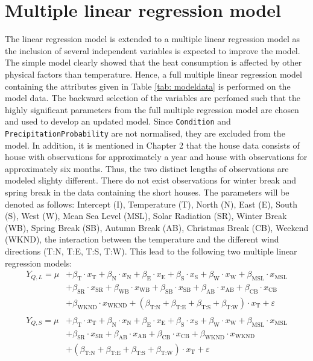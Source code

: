 \section{Multiple linear regression model}
The linear regression model is extended to a multiple linear regression model as the inclusion of several independent variables is expected to improve the model. The simple model clearly showed that the heat consumption is affected by other physical factors than temperature. Hence, a full multiple linear regression model containing the attributes given in Table \ref{tab: modeldata} is performed on the model data. The backward selection of the variables are perfomed such that the highly significant parameters from the full multiple regression model are chosen and used to develop an updated model. Since \texttt{Condition} and \texttt{PrecipitationProbability} are not normalised, they are excluded from the model. In addition, it is mentioned in Chapter 2 that the house data consists of house with observations for approximately a year and house with observations for approximately six months. Thus, the two distinct lengths of observations are modeled slighty different. There do not exist observations for winter break and spring break in the data containing the short houses. The parameters will be denoted as follows: Intercept (I), Temperature (T), North (N), East (E), South (S), West (W), Mean Sea Level (MSL), Solar Radiation (SR), Winter Break (WB), Spring Break (SB), Autumn Break (AB), Christmas Break (CB), Weekend (WKND), the interaction between the temperature and the different wind directions (T:N, T:E, T:S, T:W). This lead to the following two multiple linear regression models:
\begin{align}
    Y_{Q,L} = \mu & + \beta_{\text{T}}\cdot x_{\text{T}} + \beta_{\text{N}}\cdot x_{\text{N}} + \beta_{\text{E}}\cdot x_{\text{E}}+ \beta_{\text{S}}\cdot x_{\text{S}} + \beta_{\text{W}}\cdot x_{\text{W}} + \beta_{\text{MSL}}\cdot x_{\text{MSL}} \nonumber \\ & + \beta_{\text{SR}}\cdot x_{\text{SR}} + \beta_{\text{WB}}\cdot x_{\text{WB}} + \beta_{\text{SB}}\cdot x_{\text{SB}}  + \beta_{\text{AB}}\cdot x_{\text{AB}} + \beta_{\text{CB}}\cdot x_{\text{CB}} \label{eq: multi_L}  \\ & + \beta_{\text{WKND}}\cdot x_{\text{WKND}} + (\beta_{\text{T:N}} + \beta_{\text{T:E}} + \beta_{\text{T:S}} + \beta_{\text{T:W}}) \cdot x_{\text{T}} + \varepsilon \nonumber \\ \nonumber \\
    Y_{Q,S} = \mu & + \beta_{\text{T}}\cdot x_{\text{T}} + \beta_{\text{N}}\cdot x_{\text{N}} + \beta_{\text{E}}\cdot x_{\text{E}}+ \beta_{\text{S}}\cdot x_{\text{S}} + \beta_{\text{W}}\cdot x_{\text{W}} + \beta_{\text{MSL}}\cdot x_{\text{MSL}} \nonumber \\ & + \beta_{\text{SR}}\cdot x_{\text{SR}} + \beta_{\text{AB}}\cdot x_{\text{AB}} + \beta_{\text{CB}}\cdot x_{\text{CB}} + \beta_{\text{WKND}}\cdot x_{\text{WKND}} \label{eq: multi_S} \\ & + (\beta_{\text{T:N}} + \beta_{\text{T:E}} + \beta_{\text{T:S}} + \beta_{\text{T:W}}) \cdot x_{\text{T}} + \varepsilon  \nonumber
\end{align}
